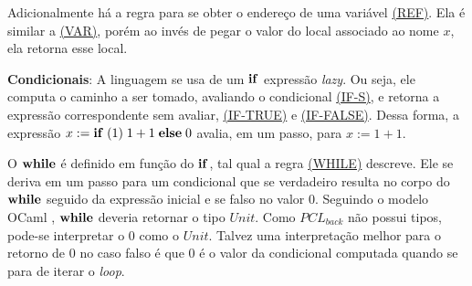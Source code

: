 

Adicionalmente há a regra para se obter o endereço de uma variável \hyperref[rule:ref]{(REF)}. Ela é similar a \hyperref[rule:var]{(VAR)}, porém ao invés de pegar o valor do local associado ao nome $x$, ela retorna esse local.

\textbf{Condicionais}: A linguagem se usa de um $\mathbf{if}$ expressão \emph{lazy}. Ou seja, ele computa o caminho a ser tomado, avaliando o condicional \hyperref[rule:if-s]{(IF-S)}, e retorna a expressão correspondente sem avaliar, \hyperref[rule:if-true]{(IF-TRUE)} e \hyperref[rule:if-false]{(IF-FALSE)}. Dessa forma, a expressão $x := \mathbf{if}\;(1)\; 1 + 1 \;\mathbf{else}\; 0$ avalia, em um passo, para $x := 1 + 1$.




    

O $\mathbf{while}$ é definido em função do $\mathbf{if}$, tal qual a regra \hyperref[rule:while]{(WHILE)} descreve. Ele se deriva em um passo para um condicional que se verdadeiro resulta no corpo do $\mathbf{while}$ seguido da expressão inicial e se falso no valor 0. Seguindo o modelo OCaml \cite{leroy3ocaml}, $\mathbf{while}$ deveria retornar o tipo $Unit$. Como $PCL_{back}$ não possui tipos, pode-se interpretar o 0 como o $Unit$. Talvez uma interpretação melhor para o retorno de 0 no caso falso é que 0 é o valor da condicional computada quando se para de iterar o \emph{loop}.

